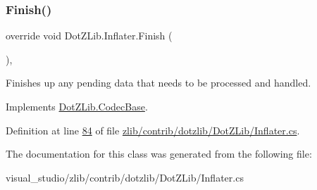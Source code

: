 \subsubsection{\texorpdfstring{Finish()}{Finish()}\hspace{0.1cm}{\footnotesize\ttfamily [2/2]}}
{\footnotesize\ttfamily override void Dot\+Z\+Lib.\+Inflater.\+Finish (\begin{DoxyParamCaption}{ }\end{DoxyParamCaption})\hspace{0.3cm}{\ttfamily [inline]}, {\ttfamily [virtual]}}



Finishes up any pending data that needs to be processed and handled. 



Implements \hyperlink{class_dot_z_lib_1_1_codec_base_abab96cb01a9b983452a31777e3a1e633}{Dot\+Z\+Lib.\+Codec\+Base}.



Definition at line \hyperlink{zlib_2contrib_2dotzlib_2_dot_z_lib_2_inflater_8cs_source_l00084}{84} of file \hyperlink{zlib_2contrib_2dotzlib_2_dot_z_lib_2_inflater_8cs_source}{zlib/contrib/dotzlib/\+Dot\+Z\+Lib/\+Inflater.\+cs}.



The documentation for this class was generated from the following file\+:\begin{DoxyCompactItemize}
\item 
visual\+\_\+studio/zlib/contrib/dotzlib/\+Dot\+Z\+Lib/\+Inflater.\+cs\end{DoxyCompactItemize}
